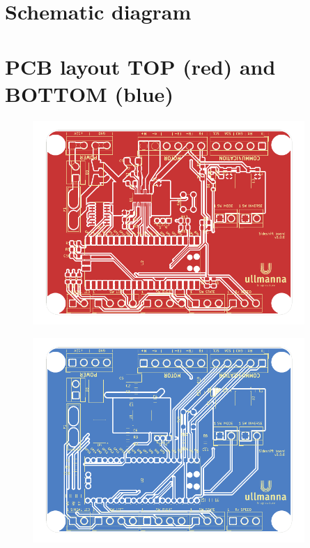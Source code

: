 \appendix
\section{Schematic diagram}
\section{PCB layout TOP (red) and BOTTOM (blue)}



\begin{figure}[h!]
    \centering
    \includegraphics[width=0.92\textwidth]{images/siteshift-F_Cu.pdf}
\end{figure}

\begin{figure}[h!]
    \centering
    \includegraphics[width=0.92\textwidth]{images/siteshift-B_Cu.pdf}
\end{figure}



